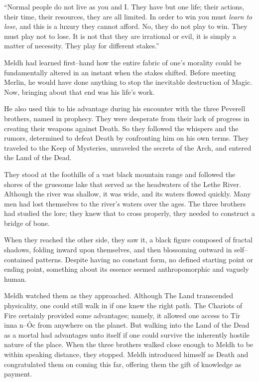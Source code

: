 “Normal people do not live as you and I. They have but one life; their actions, their time, their resources, they are all limited. In order to win you must \emph{learn to lose}, and this is a luxury they cannot afford. No, they do not play to win. They must play not to lose. It is not that they are irrational or evil, it is simply a matter of necessity. They play for different stakes.”

Meldh had learned first\mbox{--}hand how the entire fabric of one’s morality could be fundamentally altered in an instant when the stakes shifted. Before meeting Merlin, he would have done anything to stop the inevitable destruction of Magic. Now, bringing about that end was his life’s work.

He also used this to his advantage during his encounter with the three Peverell brothers, named in prophecy. They were desperate from their lack of progress in creating their weapons against Death. So they followed the whispers and the rumors, determined to defeat Death by confronting him on his own terms. They traveled to the Keep of Mysteries, unraveled the secrets of the Arch, and entered the Land of the Dead.

They stood at the foothills of a vast black mountain range and followed the shores of the gruesome lake that served as the headwaters of the Lethe River. Although the river was shallow, it was wide, and its waters flowed quickly. Many men had lost themselves to the river’s waters over the ages. The three brothers had studied the lore; they knew that to cross properly, they needed to construct a bridge of bone.

When they reached the other side, they saw it, a black figure composed of fractal shadows, folding inward upon themselves, and then blossoming outward in self\mbox{--}contained patterns. Despite having no constant form, no defined starting point or ending point, something about its essence seemed anthropomorphic and vaguely human.

Meldh watched them as they approached. Although The Land transcended physicality, one could still walk in if one knew the right path. The Chariots of Fire certainly provided some advantages; namely, it allowed one access to Tír inna n\mbox{--}Óc from anywhere on the planet. But walking into the Land of the Dead as a mortal had advantages unto itself if one could survive the inherently hostile nature of the place. When the three brothers walked close enough to Meldh to be within speaking distance, they stopped. Meldh introduced himself as Death and congratulated them on coming this far, offering them the gift of knowledge as payment.

